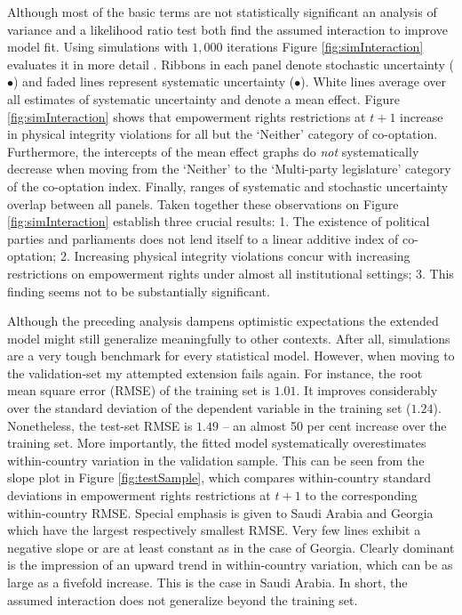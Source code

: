 Although most of the basic terms are not statistically 
significant an analysis of variance and a likelihood ratio 
test both find the assumed interaction to improve model fit.
Using simulations with $1,000$ iterations 
Figure \ref{fig:simInteraction} evaluates 
it in more detail 
\citep{KingGaryMichaelTomzWittenbergJason.2000}. Ribbons in 
each panel denote stochastic 
uncertainty ({\color{ribbon} $\bullet$}) and faded lines
represent systematic uncertainty ($\bullet$). White lines 
average over all estimates of systematic uncertainty and 
denote a mean effect. Figure \ref{fig:simInteraction} shows 
that empowerment rights restrictions at $t+1$ increase in 
physical integrity violations for all but the `Neither' 
category of co-optation. Furthermore, the intercepts of the 
mean effect graphs do \textit{not} systematically decrease 
when moving from the `Neither' to the `Multi-party 
legislature' category of the co-optation index. Finally, 
ranges of systematic and stochastic uncertainty overlap 
between all panels. Taken together these observations on
Figure \ref{fig:simInteraction} establish three crucial 
results: 1. The existence of political parties and 
parliaments does not lend itself to a linear additive index 
of co-optation; 2. Increasing physical integrity violations 
concur with increasing restrictions on empowerment rights 
under almost all institutional settings; 3. This finding 
seems not to be substantially significant.

Although the preceding analysis dampens optimistic 
expectations the extended model might still generalize 
meaningfully to other contexts. After all, 
simulations are a very tough benchmark for every statistical
model. However, when moving to the validation-set my 
attempted extension fails again. For instance, the root mean
square error (RMSE) of the training set is $1.01$. It  
improves considerably over the standard deviation of the 
dependent variable in the training set ($1.24$). 
Nonetheless, the test-set RMSE is $1.49$ -- an almost 50 
per cent increase over the training set. More importantly, 
the fitted model systematically overestimates within-country
variation in the validation sample. This can be seen from 
the slope plot in Figure \ref{fig:testSample}, which 
compares within-country standard deviations in empowerment 
rights restrictions at $t+1$ to the corresponding 
within-country RMSE. Special emphasis is given to Saudi 
Arabia and Georgia which have the largest respectively 
smallest RMSE. Very few lines exhibit a negative slope or 
are at least constant as in the case of Georgia. Clearly 
dominant is the impression of an upward trend in 
within-country variation, which can be as large as a 
fivefold increase. This is the case in Saudi Arabia. In 
short, the assumed interaction does not generalize beyond 
the training set.

